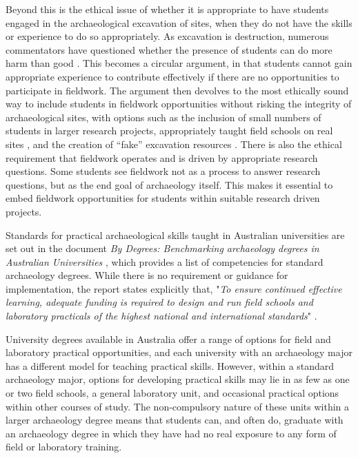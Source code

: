 \documentclass{ijsra}
\begin{document}
Beyond this is the ethical issue of whether it is appropriate to have students engaged in the archaeological excavation of sites, when they do not have the skills or experience to do so appropriately. 
As excavation is destruction, numerous commentators have questioned whether the presence of students can do more harm than good \parencites[48]{hall2005}[216]{pyburn2003}. 
This becomes a circular argument, in that students cannot gain appropriate experience to contribute effectively if there are no opportunities to participate in fieldwork. 
The argument then devolves to the most ethically sound way to include students in fieldwork opportunities without risking the integrity of archaeological sites, with options such as the inclusion of small numbers of students in larger research projects, appropriately taught field schools on real sites \parencite{mytum2012c}, 
and the creation of “fake” excavation resources \parencites{cosgrove2013}{hall2005}. 
There is also the ethical requirement that fieldwork operates and is driven by appropriate research questions. Some students see fieldwork not as a process to answer research questions, but as the end goal of archaeology itself. 
This makes it essential to embed fieldwork opportunities for students within suitable research driven projects.

Standards for practical archaeological skills taught in Australian universities are set out in the document \emph{By Degrees: Benchmarking archaeology degrees in Australian Universities} 
\parencite{beck2008}, which provides a list of competencies for standard archaeology degrees. While there is no requirement or guidance for implementation, the report states explicitly that, 
"\emph{To ensure continued effective learning, adequate funding is required to design and run field schools and laboratory practicals of the highest national and international standards}" \parencite[9]{beck2008}.

University degrees available in Australia offer a range of options for field and laboratory practical opportunities, and each university with an archaeology major has a different model for teaching practical skills.
However, within a standard archaeology major, options for developing practical skills may lie in as few as one or two field schools, a general laboratory unit, and occasional practical options within other courses of study. 
The non-compulsory nature of these units within a larger archaeology degree means that students can, and often do, graduate with an archaeology degree in which they have had no real exposure to any form of field or laboratory training.
\end{document}
